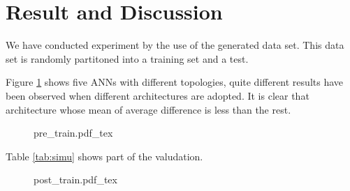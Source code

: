 \section{Result and Discussion}
We have conducted experiment by the use of the generated data set. This data
set is randomly partitoned into a training set and a test.

Figure \ref{fig:train-process} shows five ANNs with different topologies, quite
different results have been observed when different architectures are adopted.
It is clear that architecture whose mean of average difference is less than the
rest.


\begin{figure}
	\centering
	\def\svgwidth{\columnwidth}
	{pre_train.pdf_tex}
	\label{fig:train-process}
\end{figure}

Table \ref{tab:simu} shows part of the valudation.



\begin{figure}
	\centering
	\def\svgwidth{\columnwidth}
	{post_train.pdf_tex}
	\label{fig:final_train}
\end{figure}






